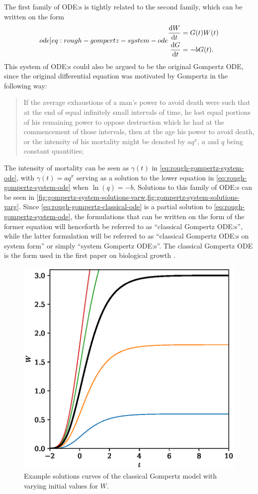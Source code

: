 The first family of ODE:s is tightly related to the second family, which can be written on the form
\begin{equation}
  \label[ode]{eq:rough-gompertz-system-ode}
  \begin{aligned} 
    \diff{W}{t} &= G(t) W(t)\\
    \diff{G}{t} &= -b G(t).
  \end{aligned}
\end{equation}
This system of ODE:s could also be argued to be the original Gompertz ODE, since the original differential equation  was motivated by Gompertz in the following way:
\blockquote[{\cite[518]{gompertz1825nature}}]{
  If the average exhaustions of a man's power to avoid death were such that at the end of equal infinitely small intervals of time, he lost equal portions of his remaining power to oppose destruction which he had at the commencement of those intervals, then at the age his power to avoid death, or the intensity of his mortality might be denoted by \(aq^x\), \(a\) and \(q\) being constant quantities;
}
The intensity of mortality can be seen as \(\gamma(t)\) in \cref{eq:rough-gompertz-system-ode}, with \(\gamma(t) = aq^x\) serving as a solution to the lower equation in \cref{eq:rough-gompertz-system-ode} when \(\ln\left(q\right) = -b\).
Solutions to this family of ODE:s can be seen in \cref{fig:gompertz-system-solutions-varw,fig:gompertz-system-solutions-varg}.
Since \cref{eq:rough-gompertz-classical-ode} is a partial solution to \cref{eq:rough-gompertz-system-ode}, the formulations that can be written on the form of the former equation will henceforth be referred to as \enquote{classical Gompertz ODE:s}, while the latter formulation will be referred to as \enquote{classical Gompertz ODE:s on system form} or simply \enquote{system Gompertz ODE:s}.
The classical Gompertz ODE is the form used in the first paper on biological growth \cite{davidson1928growth}.
\begin{figure}
  \centering
  \includegraphics[width=.32\textwidth]{images/gompertz-classical-solutions}
  \caption{Example solutions curves of the classical Gompertz model with varying initial values for \(W\).}
  \label{fig:gompertz-classical-solutions}
\end{figure}
